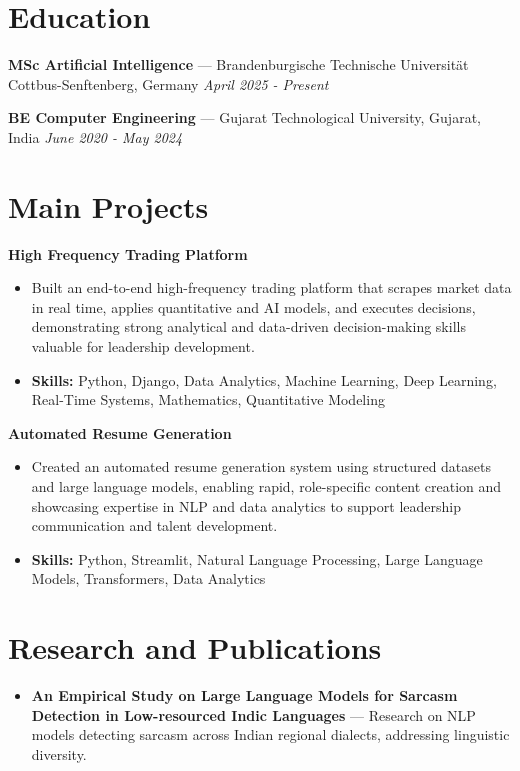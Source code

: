 \documentclass[a4paper,10pt]{article}
\begin{document}
\section*{Education}
\textbf{MSc Artificial Intelligence} — Brandenburgische Technische Universität Cottbus-Senftenberg, Germany \hfill \textit{April 2025 - Present}\par
\vspace{1.5pt}
\textbf{BE Computer Engineering} — Gujarat Technological University, Gujarat, India \hfill \textit{June 2020 - May 2024}\par

\section*{Main Projects}
\textbf{High Frequency Trading Platform}\par
\vspace{1pt}
\begin{itemize}
  \item Built an end-to-end high-frequency trading platform that scrapes market data in real time, applies quantitative and AI models, and executes decisions, demonstrating strong analytical and data-driven decision-making skills valuable for leadership development.
  \item \textbf{Skills:} Python, Django, Data Analytics, Machine Learning, Deep Learning, Real-Time Systems, Mathematics, Quantitative Modeling
\end{itemize}
\vspace{3pt}
\textbf{Automated Resume Generation}\par
\vspace{1pt}
\begin{itemize}
  \item Created an automated resume generation system using structured datasets and large language models, enabling rapid, role-specific content creation and showcasing expertise in NLP and data analytics to support leadership communication and talent development.
  \item \textbf{Skills:} Python, Streamlit, Natural Language Processing, Large Language Models, Transformers, Data Analytics
\end{itemize}

\section*{Research and Publications}
\begin{itemize}
\item \textbf{An Empirical Study on Large Language Models for Sarcasm Detection in Low-resourced Indic Languages} — Research on NLP models detecting sarcasm across Indian regional dialects, addressing linguistic diversity.
\end{itemize}
\end{document}
